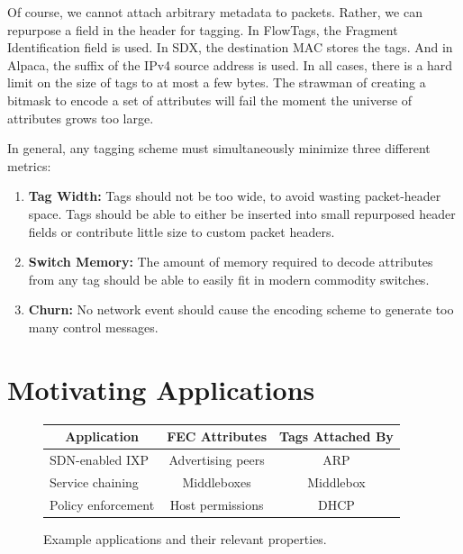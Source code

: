 Of course, we cannot attach arbitrary metadata to packets. Rather, we can
repurpose a field in the header for tagging. In FlowTags, the Fragment
Identification field is used. In SDX, the destination MAC stores the tags. And in Alpaca,
the suffix of the IPv4 source address is used. In
all cases, there is a hard limit on the size of tags to at most a few bytes.
The strawman of creating a bitmask to encode a set of attributes will fail the
moment the universe of attributes grows too large.


In general, any tagging scheme must simultaneously minimize three different metrics:
\begin{enumerate}
\item \textbf{Tag Width:} Tags should not be too wide, to avoid wasting packet-header space.
Tags should be able to either be inserted into small repurposed header fields or contribute little size to custom packet headers. 
\item \textbf{Switch Memory:} The amount of memory required to decode attributes from any tag should be able to easily fit in modern commodity switches.
\item \textbf{Churn:} No network event should cause the encoding scheme to generate too many control messages.
\end{enumerate}


\section{Motivating Applications}\label{sec:motivation}
\begin{figure}
\small
\begin{center}
    \begin{tabular}{|l|c|c|}
    \hline
    \multicolumn{1}{|c|}{\bf Application} & 
    \multicolumn{1}{c|}{\bf FEC Attributes} & 
    \multicolumn{1}{c|}{\bf Tags Attached By}\\ \hline
    SDN-enabled IXP & Advertising peers & ARP \\ \hline
    Service chaining & Middleboxes & Middlebox \\ \hline
    Policy enforcement & Host permissions & DHCP \\ \hline
    \end{tabular}
\end{center}
    \caption{Example applications and their relevant properties. } 
    \label{tab:applications}
\end{figure}


